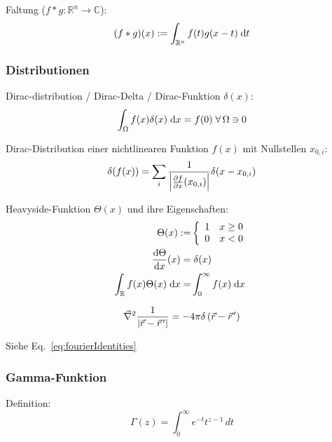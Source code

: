 \documentclass[11pt]{article}
\numberwithin{equation}{section}
\begin{document}
				\noindent
				Faltung ($f*g:\mathbb{R}^n \rightarrow \mathbb{C}$):
				\begin{equation}
					(f*g)(x) := \int_{\mathbb{R}^n} f(t) g(x-t)\;\mathrm{d} t
				\end{equation}

			\subsubsection{Distributionen}
				\noindent
				Dirac-distribution / Dirac-Delta / Dirac-Funktion $\delta(x)$:
				\begin{equation}
					\int_\Omega f(x)\delta(x)\;\mathrm{d} x = f(0)\;\forall\, \Omega\ni 0
				\end{equation}

				\noindent
				Dirac-Distribution einer nichtlinearen Funktion $f(x)$ mit Nullstellen $x_{0,i}$:
				\begin{equation}
					\delta(f(x)) = \sum_i \frac{1}{\left|\frac{\partial f}{\partial x}(x_{0,i})\right|}\delta(x-x_{0,i})
				\end{equation}

				\noindent
				Heavyside-Funktion $\Theta(x)$ und ihre Eigenschaften:
				\begin{equation}
					\begin{aligned}
						\Theta(x) :=& \left\{\begin{array}{ll}
							1 & x\ge 0 \\
							0 & x<0 \\
							\end{array}\right. \\
							\frac{\mathrm{d} \Theta}{\mathrm{d} x}(x) =&\; \delta(x) \\
						\int_{\mathbb{R}} f(x)\Theta(x)\;\mathrm{d} x =& \int_{0}^{\infty} f(x)\;\mathrm{d} x
					\end{aligned}
				\end{equation}

				\begin{equation}
					\Nabla^2\frac{1}{\left|\vec{r} - \pvec{r}'\right|} = -4\pi\delta\left(\vec{r} - \pvec{r}'\right)
				\end{equation}

				\noindent
				Siehe Eq.~\ref{eq:fourierIdentities}

			\subsubsection{Gamma-Funktion}
				\noindent
				Definition:
				\begin{equation}
					\Gamma(z)=\int_0^{\infty}e^{-t}t^{z-1}\,dt
				\end{equation}
\end{document}
